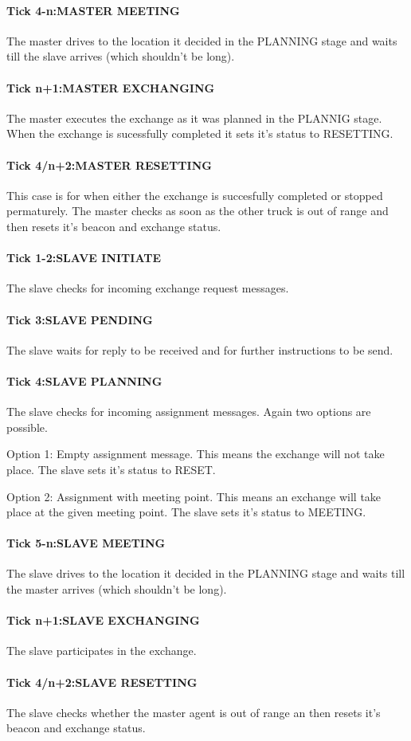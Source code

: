 \documentclass[../main.tex]{subfiles}
\begin{document}
\paragraph{Tick 4-n:MASTER MEETING}
The master drives to the location it decided in the PLANNING stage and waits till the slave arrives (which shouldn't be long). 

\paragraph{Tick n+1:MASTER EXCHANGING}
The master executes the exchange as it was planned in the PLANNIG stage. 
When the exchange is sucessfully completed it sets it's status to RESETTING.
\paragraph{Tick 4/n+2:MASTER RESETTING}
This case is for when either the exchange is succesfully completed or stopped permaturely.
The master checks as soon as the other truck is out of range and then resets it's beacon and exchange status.

\paragraph{Tick 1-2:SLAVE INITIATE}
The slave checks for incoming exchange request messages.
\paragraph{Tick 3:SLAVE PENDING}
The slave waits for reply to be received and for further instructions to be send.
\paragraph{Tick 4:SLAVE PLANNING}
The slave checks for incoming assignment messages. 
Again two options are possible.

Option 1: Empty assignment message.
This means the exchange will not take place.
The slave sets it's status to RESET.

Option 2: Assignment with meeting point.
This means an exchange will take place at the given meeting point.
The slave sets it's status to MEETING.
\paragraph{Tick 5-n:SLAVE MEETING}
The slave drives to the location it decided in the PLANNING stage and waits till the master arrives (which shouldn't be long). 
\paragraph{Tick n+1:SLAVE EXCHANGING}
The slave participates in the exchange.
\paragraph{Tick 4/n+2:SLAVE RESETTING}
The slave checks whether the master agent is out of range an then resets it's beacon and exchange status.
\end{document}
